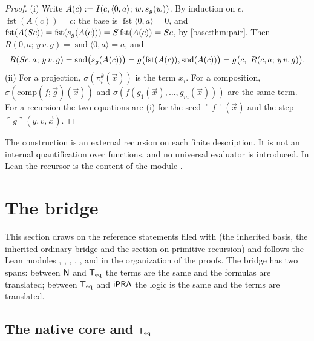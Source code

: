 \begin{proof}
(i) Write $A(c)\mathrel{:=}I(c,\langle 0,a\rangle;\,w.\,s_g(w))$.  By induction
on $c$, $\operatorname{fst}(A(c))=c$: the base is
$\operatorname{fst}\langle 0,a\rangle=0$, and
$\operatorname{fst}(A(S c))=\operatorname{fst}(s_g(A(c)))
 =S\operatorname{fst}(A(c))=S c$, by \cref{base:thm:pair}.  Then
$R(0,a;\,y\,v.\,g)=\operatorname{snd}\langle 0,a\rangle=a$, and
\[
 R(S c,a;\,y\,v.\,g)=\operatorname{snd}\bigl(s_g(A(c))\bigr)
 =g\bigl(\operatorname{fst}(A(c)),\operatorname{snd}(A(c))\bigr)
 =g\bigl(c,\ R(c,a;\,y\,v.\,g)\bigr).
\]
(ii) For a projection, $\sigma(\pi^k_i(\vec x))$ is the term $x_i$.  For a
composition, $\sigma(\mathrm{comp}(f;\vec g)(\vec x))$ and
$\sigma(f(g_1(\vec x),\dots,g_m(\vec x)))$ are the same term.  For a
recursion the two equations are (i) for the seed
$\ulcorner f\urcorner(\vec x)$ and the step
$\ulcorner g\urcorner(y,v,\vec x)$.
\end{proof}

The construction is an external recursion on each finite description.  It
is not an internal quantification over functions, and no universal
evaluator is introduced.  In Lean the recursor is the content of the module
.

\section{The bridge}
\label{base:sec:bridge}

This section draws on the reference statements filed with
 (the inherited basis, the inherited ordinary bridge and
the section on primitive recursion) and follows the Lean modules
, , ,
, ,  and
 in the organization of the proofs.  The bridge has two
spans: between $\mathsf{N}$ and $\mathsf{T}_{\mathrm{eq}}$ the terms are the same and the formulas are
translated; between $\mathsf{T}_{\mathrm{eq}}$ and $\mathsf{iPRA}$ the logic is the same and the terms
are translated.

\subsection{The native core and \texorpdfstring{$\mathsf{T}_{\mathrm{eq}}$}{Teq}}

